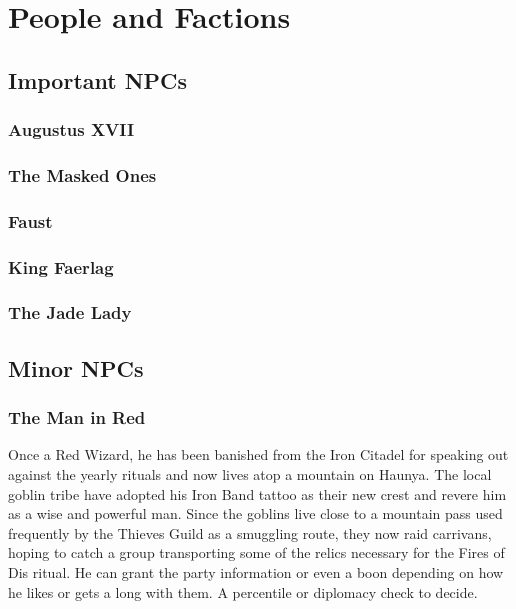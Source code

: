 \section{People and Factions}
	
	\subsection{Important NPCs}

		\subsubsection{Augustus XVII}

		\subsubsection{The Masked Ones}

		\subsubsection{Faust}

		\subsubsection{King Faerlag}

		\subsubsection{The Jade Lady}

	\subsection{Minor NPCs}

		\subsubsection{The Man in Red}

		Once a Red Wizard, he has been banished from the Iron Citadel
		for speaking out against the yearly rituals and now lives atop
		a mountain on Haunya.  The local goblin tribe have adopted his
		Iron Band tattoo as their new crest and revere him as a wise 
		and powerful man.  Since the goblins live close to a mountain
		pass used frequently by the Thieves Guild as a smuggling route,
		they now raid carrivans, hoping to catch a group transporting
		some of the relics necessary for the Fires of Dis ritual.  He
		can grant the party information or even a boon depending on how
		he likes or gets a long with them.  A percentile or diplomacy 
		check to decide. 


